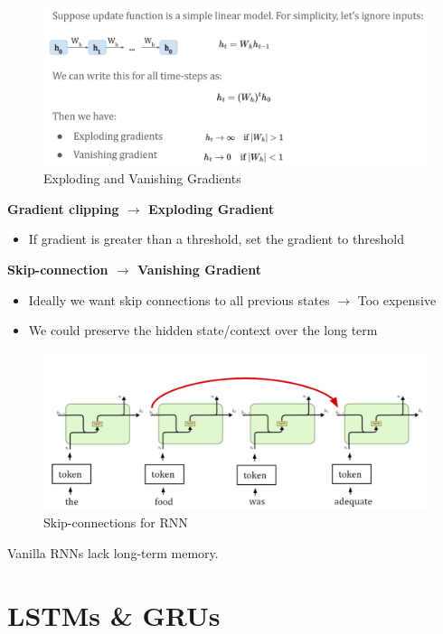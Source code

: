 \begin{figure}[h!t]
    \centering
    \includegraphics[width=0.75\linewidth]{explodingvanishinggrads.png}
    \caption{Exploding and Vanishing Gradients}
    \label{fig:enter-label}
\end{figure}

\textbf{Gradient clipping $\rightarrow$ Exploding Gradient}
\begin{itemize}
    \item If gradient is greater than a threshold, set the gradient to threshold
\end{itemize}

\textbf{Skip-connection $\rightarrow$ Vanishing Gradient}
\begin{itemize}
    \item Ideally we want skip connections to all previous states $\rightarrow$ Too expensive
    \item We could preserve the hidden state/context over the long term
\end{itemize}

\begin{figure}[h!t]
    \centering
    \includegraphics[width=0.75\linewidth]{skipconnection.png}
    \caption{Skip-connections for RNN}
    \label{fig:enter-label}
\end{figure}

\begin{idea}
    Vanilla RNNs lack long-term memory.
\end{idea}

\section{LSTMs \& GRUs}

